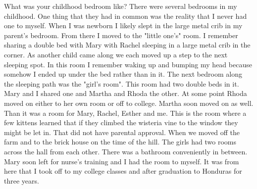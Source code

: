 What was your childhood bedroom like?
There were several bedrooms in my childhood. One thing that they had in common was the reality that I never had one to myself. When I was newborn I likely slept in the large metal crib in my parent's bedroom. From there I moved to the "little one's" room. I remember sharing a double bed with Mary with Rachel sleeping in a large metal crib in the corner. As another child came along we each moved up a step to the next sleeping spot. In this room I remember waking up and bumping my head because somehow I ended up under the bed rather than in it.
The next bedroom along the sleeping path was the "girl's room". This room had two double beds in it. Mary and I shared one and Martha and Rhoda the other. At some point Rhoda moved on either to her own room or off to college. Martha soon moved on as well. Than it was a room for Mary, Rachel, Esther and me. This is the room where a few kittens learned that if they climbed the wisteria vine to the window they might be let in. That did not have parental approval. 
When we moved off the farm and to the brick house on the time of the hill. The girls had two rooms across the hall from each other. There was a bathroom conveniently in between. Mary soon left for nurse's training and I had the room to myself. It was from here that I took off to my college classes and after graduation to Honduras for three years.






